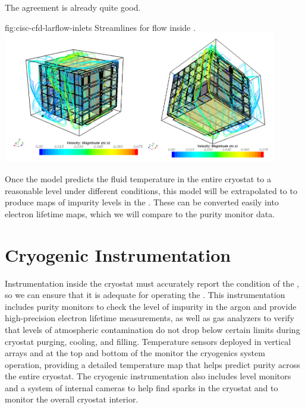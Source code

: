 The agreement is already quite good. %
\begin{dunefigure}{fig:cisc-cfd-larflow-inlets}
  {Streamlines for  flow inside  .}
  \includegraphics[width=0.9\textwidth]{graphics/cisc_cfd_larflow-inlets.png}
\end{dunefigure}



Once the   model %
predicts the fluid temperature in the entire cryostat to a reasonable level under different conditions, this model will be extrapolated to    
to produce maps of impurity levels in the . These can be converted easily into electron lifetime maps, which we will %
compare to the %
 purity monitor data. 


\section{Cryogenic Instrumentation}
\label{sec:fdgen-cryo-instr}
Instrumentation inside the cryostat must accurately report the condition of the , so we can ensure that it is adequate for operating the .
This instrumentation includes %
purity monitors %
to check the level of impurity in the argon and %
provide high-precision electron lifetime measurements,
as well as gas analyzers to verify that levels of atmospheric contamination do not drop below certain limits during cryostat purging, cooling, and filling. 
Temperature sensors deployed in vertical arrays and at the top and bottom of the  monitor the cryogenics system operation, providing a 
detailed \threed temperature map that helps predict \lar purity across the entire cryostat. The cryogenic instrumentation also includes \lar level monitors and
a system of internal cameras to help find sparks in the cryostat and %
to monitor the overall cryostat interior. 

